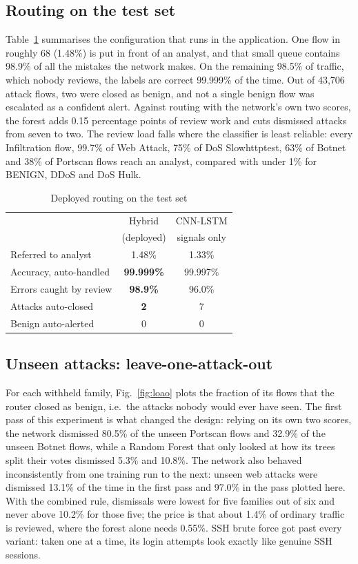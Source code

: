 \documentclass[conference]{IEEEtran}
\begin{document}
\subsection{Routing on the test set}
Table~\ref{tab:routing} summarises the configuration that runs in the application. One flow in
roughly 68 (1.48\%) is put in front of an analyst, and that small queue contains 98.9\% of all the
mistakes the network makes. On the remaining 98.5\% of traffic, which nobody reviews, the labels
are correct 99.999\% of the time. Out of 43,706 attack flows, two were closed as benign, and not a
single benign flow was escalated as a confident alert. Against routing with the network's own two
scores, the forest adds 0.15 percentage points of review work and cuts dismissed attacks from seven
to two. The review load falls where the classifier is least reliable: every Infiltration flow,
99.7\% of Web Attack, 75\% of DoS Slowhttptest, 63\% of Botnet and 38\% of Portscan flows reach an
analyst, compared with under 1\% for BENIGN, DDoS and DoS Hulk.

\begin{table}[t]
\caption{Deployed routing on the test set}
\label{tab:routing}
\centering
\footnotesize
\begin{tabular}{lcc}
\toprule
 & Hybrid & CNN-LSTM \\
 & (deployed) & signals only \\
\midrule
Referred to analyst & 1.48\% & 1.33\% \\
Accuracy, auto-handled & \textbf{99.999\%} & 99.997\% \\
Errors caught by review & \textbf{98.9\%} & 96.0\% \\
Attacks auto-closed & \textbf{2} & 7 \\
Benign auto-alerted & 0 & 0 \\
\bottomrule
\end{tabular}
\end{table}

\subsection{Unseen attacks: leave-one-attack-out}
\label{sec:loao}
For each withheld family, Fig.~\ref{fig:loao} plots the fraction of its flows that the router
closed as benign, i.e.\ the attacks nobody would ever have seen. The first pass of this experiment
is what changed the design: relying on its own two scores, the network dismissed 80.5\% of the
unseen Portscan flows and 32.9\% of the unseen Botnet flows, while a Random Forest that only looked
at how its trees split their votes dismissed 5.3\% and 10.8\%. The network also behaved
inconsistently from one training run to the next: unseen web attacks were dismissed 13.1\% of the
time in the first pass and 97.0\% in the pass plotted here. With the combined rule, dismissals
were lowest for five families out of six and never above 10.2\% for those five; the price is that
about 1.4\% of ordinary traffic is reviewed, where the forest alone needs 0.55\%. SSH brute force
got past every variant: taken one at a time, its login attempts look exactly like genuine SSH
sessions.
\end{document}
